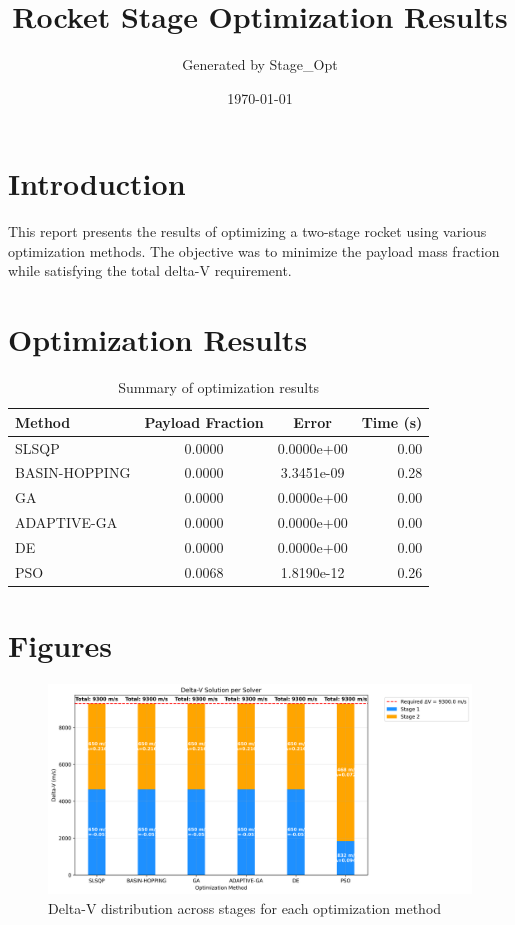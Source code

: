 \documentclass{article}
\title{Rocket Stage Optimization Results}
\author{Generated by Stage\_Opt}
\date{\today}
\begin{document}
\maketitle

\section{Introduction}
This report presents the results of optimizing a two-stage rocket using various optimization methods. The objective was to minimize the payload mass fraction while satisfying the total delta-V requirement.

\section{Optimization Results}
\begin{table}[H]
\centering
\begin{tabular}{lccr}
\toprule
Method & Payload Fraction & Error & Time (s) \\
\midrule
SLSQP & 0.0000 & 0.0000e+00 & 0.00 \\
BASIN-HOPPING & 0.0000 & 3.3451e-09 & 0.28 \\
GA & 0.0000 & 0.0000e+00 & 0.00 \\
ADAPTIVE-GA & 0.0000 & 0.0000e+00 & 0.00 \\
DE & 0.0000 & 0.0000e+00 & 0.00 \\
PSO & 0.0068 & 1.8190e-12 & 0.26 \\
\bottomrule
\end{tabular}
\caption{Summary of optimization results}
\label{tab:results}
\end{table}

\section{Figures}
\begin{figure}[H]
\centering
\includegraphics[width=\textwidth]{dv_breakdown.png}
\caption{Delta-V distribution across stages for each optimization method}
\label{fig:dv-breakdown}
\end{figure}
\end{document}
